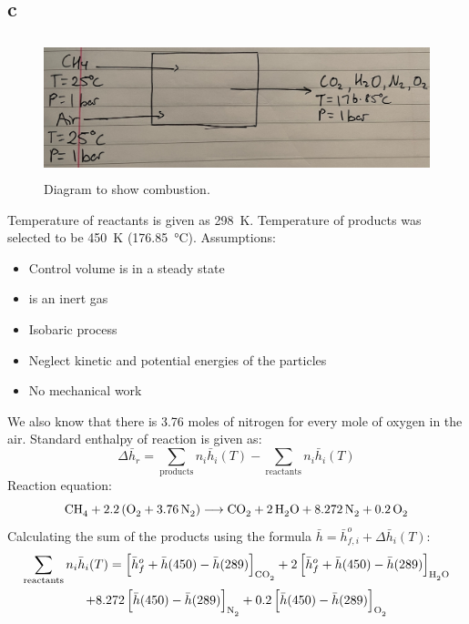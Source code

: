 \documentclass[11pt]{article}
\numberwithin{equation}{section}
\begin{document}
\subsection{c}
\begin{figure}[H]
    \centering
    \includegraphics[height = 4cm]{./img/q4c.jpg}
    \caption{Diagram to show combustion.}
    \label{fig:q4c}
\end{figure}
Temperature of reactants is given as \SI{298}{\kelvin}. Temperature of products was selected to be \SI{450}{\kelvin} (\SI{176.85} {\celsius}). Assumptions:
\begin{itemize}
    \item Control volume is in a steady state
    \item {} is an inert gas
    \item Isobaric process
    \item Neglect kinetic and potential energies of the particles
    \item No mechanical work
\end{itemize}
We also know that there is 3.76 moles of nitrogen for every mole of oxygen in the air. Standard enthalpy of reaction is given as:
\begin{equation}
    \Delta \bar{h}_r = \sum_{\textrm{products}} n_i \bar{h}_{i}(T) - \sum_{\textrm{reactants}} n_i \bar{h}_{i}(T)
\end{equation}
Reaction equation:
\begin{equation}
    \ce{CH4} + 2.2\left(\ce{O2} + \ce{3.76N2}\right)\longrightarrow \ce{CO2} + \ce{2H2O} + \ce{8.272N2} + \ce{0.2O2}
\end{equation}
Calculating the sum of the products using the formula $\bar{h} = \bar{h}^o_{f,i} + \Delta \bar{h}_i(T)$:
\begin{multline}
    \sum_{\textrm{reactants}} n_i \bar{h}_{i}(T) = \left[ \bar{h}^o_f + \bar{h}(450) - \bar{h}(289)\right]_{\ce{CO2}} + 2 \left[ \bar{h}^o_f + \bar{h}(450) - \bar{h}(289)\right]_{\ce{H2O}} \\ + 8.272 \left[\bar{h}(450) - \bar{h}(289)\right]_{\ce{N2}} + 0.2 \left[ \bar{h}(450) - \bar{h}(289)\right]_{\ce{O2}}
\end{multline}
\end{document}
